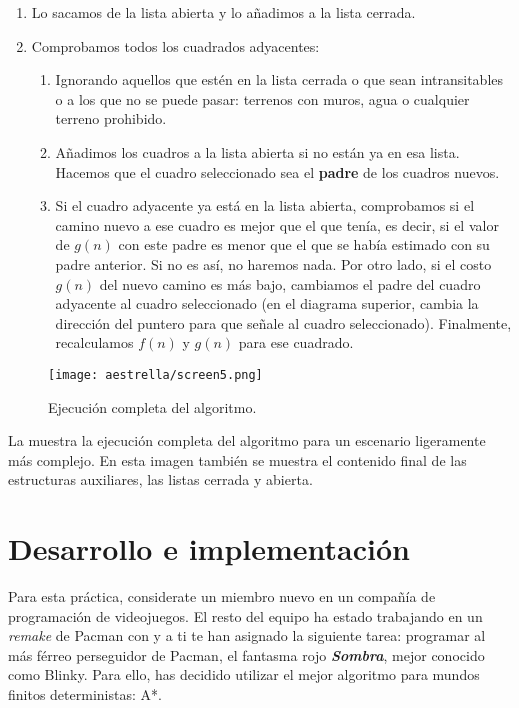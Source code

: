\begin{enumerate}
  \item Lo sacamos de la lista abierta y lo añadimos a la lista cerrada.  

  \item Comprobamos todos los cuadrados adyacentes:
  
  \begin{enumerate}
   \item Ignorando aquellos que estén en la lista cerrada o que sean intransitables o a los que no se puede pasar: terrenos con muros, agua o cualquier terreno prohibido.
   
   \item Añadimos los cuadros a la lista abierta si no están ya en esa lista. Hacemos que el cuadro seleccionado sea el \textbf{padre} de los cuadros nuevos.
   
   \item Si el cuadro adyacente ya está en la lista abierta, comprobamos si el camino nuevo a ese cuadro es mejor que el que tenía, es decir, si el valor de \(g(n)\) con este padre es menor que el que se había estimado con su padre anterior. Si no es así, no haremos nada. Por otro lado, si el costo \(g(n)\) del nuevo camino es más bajo, cambiamos el padre del cuadro adyacente al cuadro seleccionado (en el diagrama superior, cambia la dirección del puntero para que señale al cuadro seleccionado). Finalmente, recalculamos \(f(n)\) y \(g(n)\) para ese cuadrado.
  \end{enumerate}
\end{enumerate}


\begin{figure}[h!]
  \centering
  \texttt{[image: aestrella/screen5.png]}
  \caption{Ejecución completa del algoritmo.}
  \label{fig:fig4P4}
\end{figure}

La  muestra la ejecución completa del algoritmo para un escenario ligeramente más complejo.  En esta imagen también se muestra el contenido final de las estructuras auxiliares, las listas cerrada y abierta.


\section{Desarrollo e implementaci\'on}

Para esta práctica, considerate un miembro nuevo en un compañía de programación de videojuegos.  El resto del equipo ha estado trabajando en un \textit{remake} de Pacman con  y a ti te han asignado la siguiente tarea: programar al más férreo perseguidor de Pacman, el fantasma rojo \textbf{\textit{Sombra}}, mejor conocido como Blinky. Para ello, has decidido utilizar el mejor algoritmo para mundos finitos deterministas: A*.


